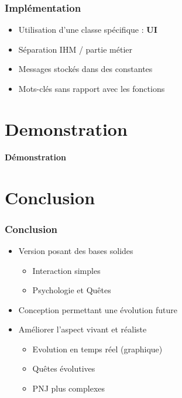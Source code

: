 \documentclass{beamer}
\begin{document}
\begin{frame}
   \frametitle{Implémentation}
  \begin{itemize}
  \item Utilisation d'une classe spécifique : \textbf{UI}
  \item Séparation IHM / partie métier
  \item Messages stockés dans des constantes
  \item Mots-clés sans rapport avec les fonctions
  \end{itemize} 
\end{frame}

\author{PATTYN Maxime}

\section{Demonstration}
\begin{frame}
\begin{center}
  \textbf{Démonstration}
\end{center}
\end{frame}


\section{Conclusion}
\begin{frame}
  \frametitle{Conclusion}
  \begin{itemize}
  \item Version posant des bases solides
    \begin{itemize}
    \item Interaction simples
    \item Psychologie et Quêtes
    \end{itemize}
  \item Conception permettant une évolution future
  \item Améliorer l'aspect vivant et réaliste
    \begin{itemize}
    \item Evolution en temps réel (graphique)
    \item Quêtes évolutives
    \item PNJ plus complexes
    \end{itemize}
  \end{itemize}
\end{frame}
\end{document}
